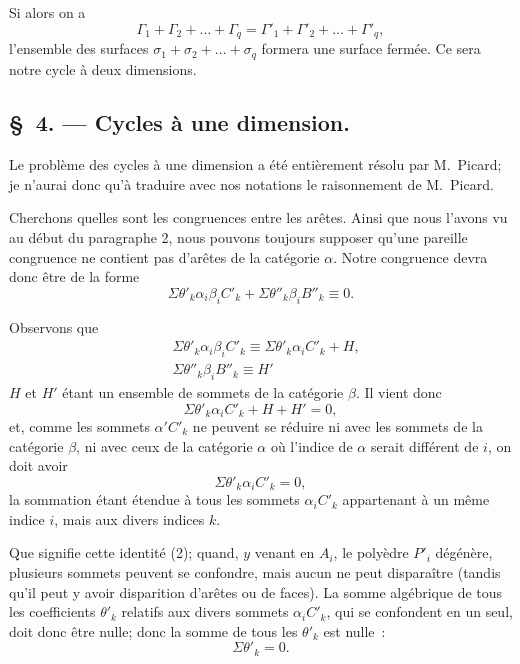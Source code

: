 \documentclass{article}
\begin{document}
Si alors on a
\[ \Gamma_{1} + \Gamma_{2} + \ldots + \Gamma_{q} = \Gamma'_{1} + \Gamma'_{2} + \ldots + \Gamma'_{q}, \]
l'ensemble des surfaces $\sigma_{1} + \sigma_{2} + \ldots + \sigma_{q}$ formera une surface fermée. Ce sera notre cycle à deux dimensions.

\subsection*{\S~4. --- Cycles à une dimension.}

Le problème des cycles à une dimension a été entièrement résolu par M.~Picard; je n'aurai donc qu'à traduire avec nos notations le raisonnement de M.~Picard.


Cherchons quelles sont les congruences entre les arêtes. Ainsi que nous l'avons vu au début du paragraphe 2, nous pouvons toujours supposer qu'une pareille congruence ne contient pas d'arêtes de la catégorie $\alpha$. Notre congruence devra donc être de la forme
\[ \Sigma \theta'_{k} \alpha_{i}\beta_{i}C'_{k} + \Sigma \theta''_{k} \beta_{i}B''_{k} \equiv 0. \tag{1} \]

Observons que
\[ \begin{aligned} &\Sigma \theta'_{k} \alpha_{i}\beta_{i}C'_{k} \equiv \Sigma \theta'_{k} \alpha_{i}C'_{k} + H,\\ &\Sigma \theta''_{k} \beta_{i}B''_{k} \equiv H' \end{aligned} \]
$H$ et $H'$ étant un ensemble de sommets de la catégorie $\beta$. Il vient donc
\[ \Sigma \theta'_{k} \alpha_{i}C'_{k} + H + H' = 0, \]
et, comme les sommets $\alpha'C'_{k}$ ne peuvent se réduire ni avec les sommets de la catégorie $\beta$, ni avec ceux de la catégorie $\alpha$ où l'indice de $\alpha$ serait différent de $i$, on doit avoir
\[ \Sigma \theta'_{k} \alpha_{i}C'_{k} = 0, \tag{2} \]
la sommation étant étendue à tous les sommets $\alpha_{i}C'_{k}$ appartenant à un même indice $i$, mais aux divers indices $k$.

Que signifie cette identité (2); quand, $y$ venant en $A_{i}$, le polyèdre $P'_{i}$ dégénère, plusieurs sommets peuvent se confondre, mais aucun ne peut disparaître (tandis qu'il peut y avoir disparition d'arêtes ou de faces). La somme algébrique de tous les coefficients $\theta'_{k}$ relatifs aux divers sommets $\alpha_{i}C'_{k}$, qui se confondent en un seul, doit donc être nulle; donc la somme de tous les $\theta'_{k}$ est nulle~:
\[ \Sigma \theta'_{k} = 0. \tag{3} \]
\end{document}
